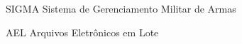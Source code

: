 \begin{siglas}
  \item[SIGMA] Sistema de Gerenciamento Militar de Armas
  \item[AEL] Arquivos Eletrônicos em Lote 
\end{siglas}